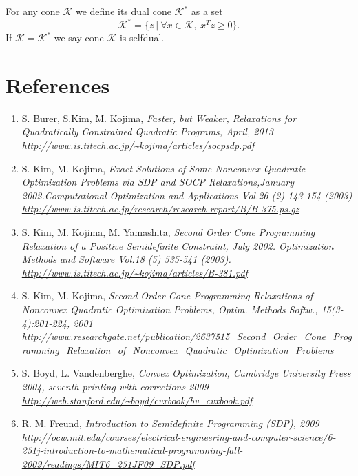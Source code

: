 \documentclass[10pt,oneside]{book}
\theoremstyle{definition}
\begin{document}
\label{defDualCone}
For any cone $\mathcal{K}$ we define its dual cone $\mathcal{K}^*$ as a set
$$\mathcal{K}^* = \{z\ |\ \forall x\in\mathcal{K}, \ x^Tz\geq 0\}.$$
If  $\mathcal{K} =  \mathcal{K}^*$ we say cone $\mathcal{K}$ is selfdual.

\chapter*{References}

\begin{enumerate}
\renewcommand*\labelenumi{[\theenumi]}

%
\item S. Burer, S.Kim, M. Kojima, \it Faster, but Weaker, Relaxations for Quadratically Constrained Quadratic Programs, \rm April, 2013 \\
\url{http://www.is.titech.ac.jp/~kojima/articles/socpsdp.pdf}
\label{BurerKimKojimaFasterWeakerRelax}
%
\item S. Kim, M. Kojima, \it Exact Solutions of Some Nonconvex Quadratic Optimization Problems via SDP and SOCP Relaxations,\rm January 2002.Computational Optimization and Applications Vol.26 (2) 143-154 (2003)\\
\url{http://www.is.titech.ac.jp/research/research-report/B/B-375.ps.gz}
\label{KimKojimaExactSolViaSDPandSOCP}
%
\item S. Kim, M. Kojima, M. Yamashita, \it Second Order Cone Programming Relaxation of a Positive Semidefinite Constraint, \rm July 2002. Optimization Methods and Software Vol.18 (5) 535-541 (2003).\\
\url{http://www.is.titech.ac.jp/~kojima/articles/B-381.pdf}
\label{KimKojimaSOCPRelaxOfPSDconstr}
%
\item S. Kim, M. Kojima, \it Second Order Cone Programming Relaxations of Nonconvex Quadratic Optimization Problems, \rm Optim. Methods Softw., 15(3-4):201-224, 2001 \\
\url{http://www.researchgate.net/publication/2637515_Second_Order_Cone_Programming_Relaxation_of_Nonconvex_Quadratic_Optimization_Problems}
\label{KimKojimaSOCPofNoncvxQOP}
%
\item S. Boyd, L. Vandenberghe, \it Convex Optimization, \rm Cambridge University Press 2004, seventh printing with corrections 2009 \\
\url{http://web.stanford.edu/~boyd/cvxbook/bv_cvxbook.pdf}
\label{BoydCvxOpt}
%
\item R. M. Freund, \it Introduction to Semidefinite Programming (SDP), \rm 2009 \\ \url{http://ocw.mit.edu/courses/electrical-engineering-and-computer-science/6-251j-introduction-to-mathematical-programming-fall-2009/readings/MIT6_251JF09_SDP.pdf}

\end{enumerate}
\end{document}

